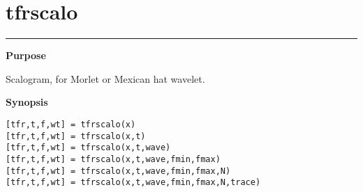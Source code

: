 

\section*{\hspace*{-1.6cm} tfrscalo}

\vspace*{-.4cm}
\hspace*{-1.6cm}\rule[0in]{16.5cm}{.02cm}
\vspace*{.2cm}

{\bf \large \sf Purpose}\\
\hspace*{1.5cm}
\begin{minipage}[t]{13.5cm}
Scalogram, for Morlet or Mexican hat wavelet.
\end{minipage}
\vspace*{.5cm}

{\bf \large \sf Synopsis}\\
\hspace*{1.5cm}
\begin{minipage}[t]{13.5cm}
\begin{verbatim}
[tfr,t,f,wt] = tfrscalo(x)
[tfr,t,f,wt] = tfrscalo(x,t)
[tfr,t,f,wt] = tfrscalo(x,t,wave)
[tfr,t,f,wt] = tfrscalo(x,t,wave,fmin,fmax)
[tfr,t,f,wt] = tfrscalo(x,t,wave,fmin,fmax,N)
[tfr,t,f,wt] = tfrscalo(x,t,wave,fmin,fmax,N,trace)
\end{verbatim}
\end{minipage}
\vspace*{.5cm}

